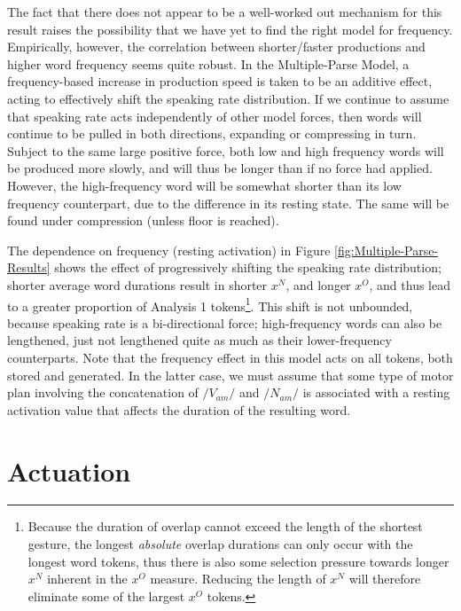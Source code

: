 The fact that there does not appear to be a well-worked out mechanism
for this result raises the possibility that we have yet to find the
right model for frequency. Empirically, however, the correlation between
shorter/faster productions and higher word frequency seems quite robust.
In the Multiple-Parse Model, a frequency-based increase in production
speed is taken to be an additive effect, acting to effectively shift
the speaking rate distribution. If we continue to assume that speaking
rate acts independently of other model forces, then words will continue
to be pulled in both directions, expanding or compressing in turn.
Subject to the same large positive force, both low and high frequency
words will be produced more slowly, and will thus be longer than if
no force had applied. However, the high-frequency word will be somewhat
shorter than its low frequency counterpart, due to the difference
in its resting state. The same will be found under compression (unless
floor is reached).

The dependence on frequency (resting activation) in Figure \ref{fig:Multiple-Parse-Results}
shows the effect of progressively shifting the speaking rate distribution;
shorter average word durations result in shorter $x^{N}$, and longer
$x^{O}$, and thus lead to a greater proportion of Analysis 1 tokens\footnote{Because the duration of overlap cannot exceed the length of the shortest
gesture, the longest \emph{absolute} overlap durations can only occur
with the longest word tokens, thus there is also some selection pressure
towards longer $x^{N}$ inherent in the $x^{O}$ measure. Reducing
the length of $x^{N}$ will therefore eliminate some of the largest
$x^{O}$ tokens.}. This shift is not unbounded, because speaking rate is a bi-directional
force; high-frequency words can also be lengthened, just not lengthened
quite as much as their lower-frequency counterparts. Note that the
frequency effect in this model acts on all tokens, both stored and
generated. In the latter case, we must assume that some type of motor
plan involving the concatenation of $/V_{am}/$ and $/N_{am}/$ is
associated with a resting activation value that affects the duration
of the resulting word. 

\section{Actuation}

